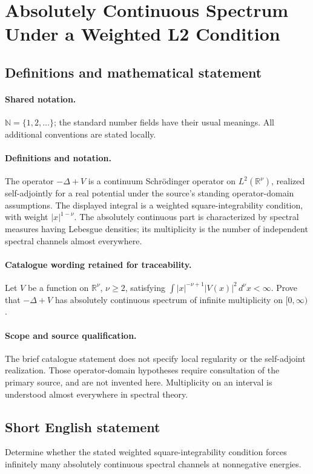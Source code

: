 \documentclass[11pt]{article}
\begin{document}
\section{Absolutely Continuous Spectrum Under a Weighted L2 Condition}\label{statement}

\subsection{Definitions and mathematical statement}

\paragraph{Shared notation.}$\mathbb N=\{1,2,\ldots\}$; the standard number fields have their usual meanings. All additional conventions are stated locally.


\paragraph{Definitions and notation.}The operator $-\Delta+V$ is a continuum Schrödinger operator on $L^2(\mathbb R^\nu)$, realized self-adjointly for a real potential under the source’s standing operator-domain assumptions. The displayed integral is a weighted square-integrability condition, with weight $|x|^{1-\nu}$. The absolutely continuous part is characterized by spectral measures having Lebesgue densities; its multiplicity is the number of independent spectral channels almost everywhere.

\paragraph{Catalogue wording retained for traceability.}
Let $V$ be a function on $\mathbb R^\nu$, $\nu\geq2$, satisfying $\int |x|^{-\nu+1}|V(x)|^2\,d^\nu x<\infty$. Prove that $-\Delta+V$ has absolutely continuous spectrum of infinite multiplicity on $[0,\infty)$.
\paragraph{Scope and source qualification.}The brief catalogue statement does not specify local regularity or the self-adjoint realization. Those operator-domain hypotheses require consultation of the primary source, and are not invented here. Multiplicity on an interval is understood almost everywhere in spectral theory.
\subsection{Short English statement}
Determine whether the stated weighted square-integrability condition forces infinitely many absolutely continuous spectral channels at nonnegative energies.
\end{document}
